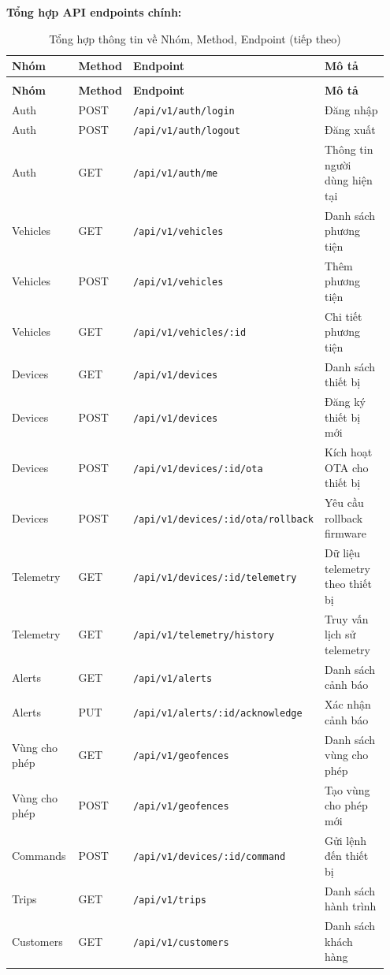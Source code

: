 \documentclass[a4paper]{extarticle}
\newcommand{\thesissettableid}[2]{%
  \renewcommand{\thetable}{#1}%
  \renewcommand{\theHtable}{#2}%
}
\begin{document}
\textbf{Tổng hợp API endpoints chính:}


{\thesissettableid{4.3A}{tab-ch4-tong-hop-thong-tin-ve-nhom-method-endpoint}
\def\LTcaptype{table}
\begin{longtable}{|L{0.226\linewidth}|L{0.137\linewidth}|L{0.204\linewidth}|L{0.387\linewidth}|}
\caption{Tổng hợp thông tin về Nhóm, Method, Endpoint}\label{tab:ch4-tong-hop-thong-tin-ve-nhom-method-endpoint}\\
\hline \textbf{Nhóm} & \textbf{Method} & \textbf{Endpoint} & \textbf{Mô tả} \\
\hline
\endfirsthead
\caption[]{Tổng hợp thông tin về Nhóm, Method, Endpoint (tiếp theo)}\\
\hline \textbf{Nhóm} & \textbf{Method} & \textbf{Endpoint} & \textbf{Mô tả} \\
\hline
\endhead
\hline
\endfoot
\endlastfoot
Auth & POST & \nolinkurl{/api/v1/auth/login} & Đăng nhập \\\hline
Auth & POST & \nolinkurl{/api/v1/auth/logout} & Đăng xuất \\\hline
Auth & GET & \nolinkurl{/api/v1/auth/me} & Thông tin người dùng hiện tại \\\hline
Vehicles & GET & \nolinkurl{/api/v1/vehicles} & Danh sách phương tiện \\\hline
Vehicles & POST & \nolinkurl{/api/v1/vehicles} & Thêm phương tiện \\\hline
Vehicles & GET & \nolinkurl{/api/v1/vehicles/:id} & Chi tiết phương tiện \\\hline
Devices & GET & \nolinkurl{/api/v1/devices} & Danh sách thiết bị \\\hline
Devices & POST & \nolinkurl{/api/v1/devices} & Đăng ký thiết bị mới \\\hline
Devices & POST & \nolinkurl{/api/v1/devices/:id/ota} & Kích hoạt OTA cho
thiết bị \\\hline
Devices & POST & \nolinkurl{/api/v1/devices/:id/ota/rollback} & Yêu cầu
rollback firmware \\\hline
Telemetry & GET & \nolinkurl{/api/v1/devices/:id/telemetry} & Dữ liệu
telemetry theo thiết bị \\\hline
Telemetry & GET & \nolinkurl{/api/v1/telemetry/history} & Truy vấn lịch sử
telemetry \\\hline
Alerts & GET & \nolinkurl{/api/v1/alerts} & Danh sách cảnh báo \\\hline
Alerts & PUT & \nolinkurl{/api/v1/alerts/:id/acknowledge} & Xác nhận cảnh
báo \\\hline
Vùng cho phép & GET & \nolinkurl{/api/v1/geofences} & Danh sách vùng cho phép \\\hline
Vùng cho phép & POST & \nolinkurl{/api/v1/geofences} & Tạo vùng cho phép mới \\\hline
Commands & POST & \nolinkurl{/api/v1/devices/:id/command} & Gửi lệnh đến
thiết bị \\\hline
Trips & GET & \nolinkurl{/api/v1/trips} & Danh sách hành trình \\\hline
Customers & GET & \nolinkurl{/api/v1/customers} & Danh sách khách hàng \\\hline
\end{longtable}
}
\end{document}
